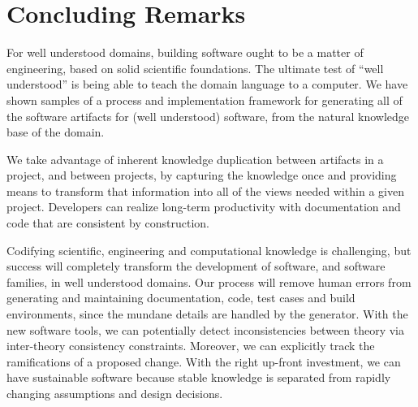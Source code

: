 \documentclass[sigconf,review]{acmart}
\begin{document}
\section{Concluding Remarks} \label{ch:concluding_remarks}

For well understood domains, building software ought to be a matter of
engineering, based on solid scientific foundations. The ultimate test of ``well
understood'' is being able to teach the domain language to a computer. We have
shown samples of a process and implementation framework for generating all of
the software artifacts for (well understood) software, from the natural
knowledge base of the domain.

We take advantage of inherent knowledge duplication between artifacts in a
project, and between projects, by capturing the knowledge once and providing
means to transform that information into all of the views needed within a given
project.  Developers can realize long-term productivity with documentation and
code that are consistent by construction.

Codifying scientific, engineering and computational knowledge is challenging,
but success will completely transform the development of software, and software
families, in well understood domains. Our process will remove human errors from
generating and maintaining documentation, code, test cases and build
environments, since the mundane details are handled by the generator.  With the
new software tools, we can potentially detect inconsistencies between theory via
inter-theory consistency constraints. Moreover, we can explicitly track the
ramifications of a proposed change.  With the right up-front investment, we can
have sustainable software because stable knowledge is separated from rapidly
changing assumptions and design decisions.



\end{document}
